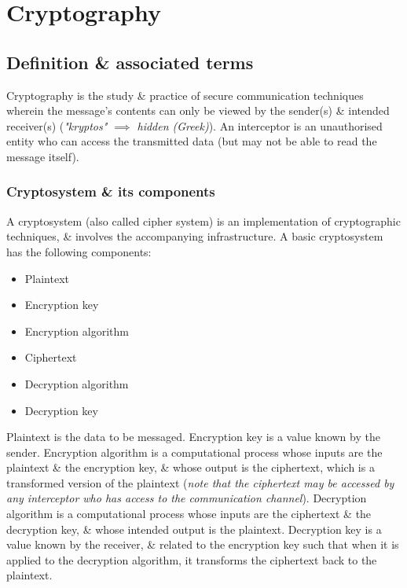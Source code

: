 \chapter{Cryptography}
\section{Definition \& associated terms}
Cryptography is the study \& practice of secure communication techniques wherein the message's contents can only be viewed by the sender(s) \& intended receiver(s) (\textit{"kryptos" $\implies$ hidden (Greek)}). An interceptor is an unauthorised entity who can access the transmitted data (but may not be able to read the message itself).

\subsection{Cryptosystem \& its components}
A cryptosystem (also called cipher system) is an implementation of cryptographic techniques, \& involves the accompanying infrastructure. A basic cryptosystem has the following components:

\begin{itemize}
	\item Plaintext
	\item Encryption key
	\item Encryption algorithm
	\item Ciphertext
	\item Decryption algorithm
	\item Decryption key
\end{itemize}

Plaintext is the data to be messaged. Encryption key is a value known by the sender. Encryption algorithm is a computational process whose inputs are the plaintext \& the encryption key, \& whose output is the ciphertext, which is a transformed version of the plaintext (\textit{note that the ciphertext may be accessed by any interceptor who has access to the communication channel}). Decryption algorithm is a computational process whose inputs are the ciphertext \& the decryption key, \& whose intended output is the plaintext. Decryption key is a value known by the receiver, \& related to the encryption key such that when it is applied to the decryption algorithm, it transforms the ciphertext back to the plaintext.

